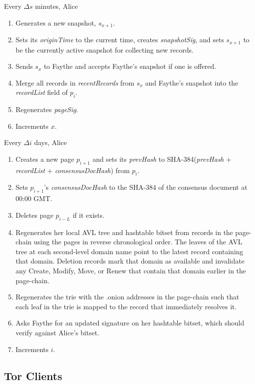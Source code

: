 Every $ \Delta s $ minutes, Alice

\begin{enumerate}
	\item Generates a new snapshot, $ s_{x+1} $.
	\item Sets its \emph{originTime} to the current time, creates \emph{snapshotSig}, and sets $ s_{x+1} $ to be the currently active snapshot for collecting new records.
	\item Sends $ s_{x} $ to Faythe and accepts Faythe's snapshot if one is offered.
	\item Merge all records in \emph{recentRecords} from $ s_{x} $ and Faythe's snapshot into the \emph{recordList} field of $ p_{i} $.
	\item Regenerates \emph{pageSig}.
	\item Increments $ x $.
\end{enumerate}

Every $ \Delta i $ days, Alice

\begin{enumerate}
	\item Creates a new page $ p_{i + 1} $ and sets its \emph{prevHash} to SHA-384(\emph{prevHash} + \emph{recordList} + \emph{consensusDocHash}) from $ p_{i} $.
	\item Sets $ p_{i + 1} $'s \emph{consensusDocHash} to the SHA-384 of the consensus document at 00:00 GMT.
	\item Deletes page $ p_{i - L} $ if it exists.
	\item Regenerates her local AVL tree and hashtable bitset from records in the page-chain using the pages in reverse chronological order. The leaves of the AVL tree at each second-level domain name point to the latest record containing that domain. Deletion records mark that domain as available and invalidate any Create, Modify, Move, or Renew that contain that domain earlier in the page-chain.
	\item Regenerates the trie with the .onion addresses in the page-chain such that each leaf in the trie is mapped to the record that immediately resolves it.
	\item Asks Faythe for an updated signature on her hashtable bitset, which should verify against Alice's bitset.
	\item Increments $ i $.
\end{enumerate}


\subsection{Tor Clients}

